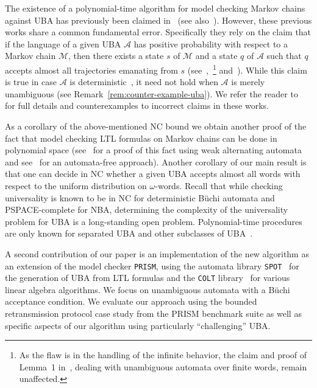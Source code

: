 \documentclass{elsarticle}
\def\cA{\mathcal{A}}
\def\cM{\mathcal{M}}
\newcommand{\prism}{\texttt{PRISM}}
\newcommand{\colt}{\texttt{COLT}}
\newcommand{\spot}{\texttt{SPOT}}
\begin{document}
The existence of a polynomial-time algorithm for model checking Markov
chains against UBA has previously been claimed
in~\cite{BenLenWor13,BenLenWor14,LenhardtThesis13} (see
also~\cite{Len-Tulip13}).  However, these previous works share a
common fundamental error.  Specifically they rely on the claim that if
the language of a given UBA $\cA$ has positive probability with
respect to a Markov chain $\cM$, then there exists a state $s$ of
$\cM$ and a state $q$ of $\cA$ such that $q$ accepts almost all
trajectories emanating from $s$ (see~\cite[Lemma
7.1]{BenLenWor13},~\cite[Theorem 2]{BenLenWor14}\footnote{As the flaw is in the handling of the infinite behavior, the
  claim and proof of Lemma~1 in~\cite{BenLenWor14}, dealing with
  unambiguous automata over finite words, remain unaffected.  }
and~\cite[Section 3.3.1]{LenhardtThesis13}).  While this claim is true
in case $\cA$ is deterministic~\cite{CY95}, it need not hold when
$\cA$ is merely unambiguous (see
Remark~\ref{rem:counter-example-uba}).  We refer the reader
to~\cite{BKKKMW16} for full details and counterexamples to incorrect
claims in these works.

As a corollary of the above-mentioned NC bound we obtain another proof
of the fact that model checking LTL formulas on Markov chains can be
done in polynomial space (see~\cite{BusRubVar04} for a proof of this
fact using weak alternating automata and see~\cite{CY88,CY95} for an
automata-free approach).  Another corollary of our main result is that
one can decide in NC whether a given UBA accepts almost all words with
respect to the uniform distribution on $\omega$-words.  Recall that
while checking universality is known to be in NC for
deterministic B\"uchi automata and PSPACE-complete for NBA,
determining the complexity of the universality problem for UBA is a
long-standing open problem.  Polynomial-time procedures are only known
for separated UBA and other subclasses of
UBA~\cite{BousLoed10,IsaLoed12}.



A second contribution of our paper is an implementation of the new
algorithm as an extension of the model checker \prism{}, using the
automata library \spot{}~\cite{Duret13} for the generation of UBA from
LTL formulas and the \colt{} library~\cite{Hoschek04} for various
linear algebra algorithms.
We focus on unambiguous automata with a B\"uchi acceptance condition.
We evaluate our approach using the bounded
retransmission protocol case study from the PRISM benchmark suite
\cite{prismBenchmark} as well as specific aspects of our algorithm
using particularly ``challenging'' UBA.
\end{document}

